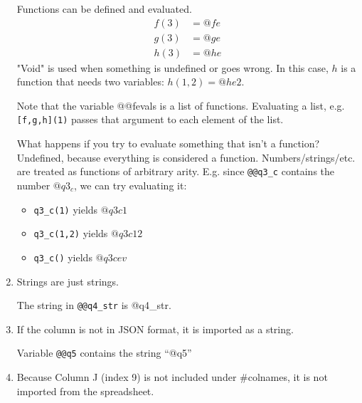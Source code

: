 \documentclass[a4paper,12pt]{article}
\begin{document}
\begin{enumerate}
		Functions can be defined and evaluated. 
		\begin{align*}
			f(3) &= @fe\\
			g(3) &= @ge\\
			h(3) &= @he
		\end{align*}
		"Void" is used when something is undefined or goes wrong.
		In this case, $h$ is a function that needs two variables:
		$h(1,2) = @he2$.
		
		Note that the variable @@fevals is a list of functions.
		Evaluating a list, e.g. \verb|[f,g,h](1)| passes that argument to each element of the list. 

		What happens if you try to evaluate something that isn't a function? 
		Undefined, because everything is considered a function.
		Numbers/strings/etc. are treated as functions of arbitrary arity. 
		E.g. since \verb|@@q3_c| contains the number $@q3_c$, we can try evaluating it:
		\begin{itemize}
			\item \verb|q3_c(1)| yields $@q3c1$
			\item \verb|q3_c(1,2)| yields $@q3c12$
			\item \verb|q3_c()| yields $@q3cev$
		\end{itemize}
		


	\item
		Strings are just strings.

		The string in \verb|@@q4_str| is @q4_str.

	\item 
		If the column is not in JSON format, it is imported as a string.

		Variable \verb|@@q5| contains the string ``@q5''

	\item
		Because Column J (index 9) is not included under \#colnames, it is not imported from the spreadsheet.
\end{enumerate}
\end{document}
